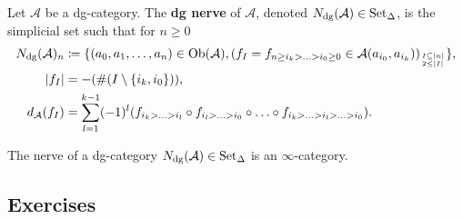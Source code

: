\begin{defi}
	Let $ \mathcal{ A } $ be a dg-category. 
	The \textbf{dg nerve} of $ \mathcal{ A } $, denoted $ N_{ \operatorname{dg} } ( \mathcal{ A } ) \in \operatorname{Set}_{\Delta} $, is the simplicial set such that for $ n \geq 0 $
	\begin{align*}
		N_{ \operatorname{dg} } ( \mathcal{ A } )_n
		&\coloneqq 
		\{ ( a_0 , a_1 , \dotsc , a_n ) \in \operatorname{Ob} ( \mathcal{ A } ) , ( f_I = f_{ n \geq i_k > \dotsc > i_0 \geq 0 } \in \mathcal{ A } ( a_{ i_0 } , a_{ i_k } ) )_{ I \subseteq [ n ] \atop 2 \leq \lvert I \rvert } \},
		\\
		\lvert f_I \rvert 
		&=
		- ( \# ( I \setminus \{ i_k , i_0 \} ) ),
		\\
		d_{ \mathcal{ A } } ( f_I ) 
		&=
		\sum_{ l = 1 }^{ k - 1 } ( - 1 )^l ( f_{ i_k > \dotsc > i_l } \circ f_{ i_l > \dotsc > i_0 } \circ \dotsc \circ f_{ i_k > \dotsc > i_l > \dotsc > i_0 } ) .
	\end{align*}
\end{defi}

\begin{thm}
	The nerve of a dg-category $ N_{ \operatorname{dg} } ( \mathcal{ A } ) \in \operatorname{Set}_{\Delta} $ is an $ \infty $-category.
\end{thm}

\subsection{Exercises}

